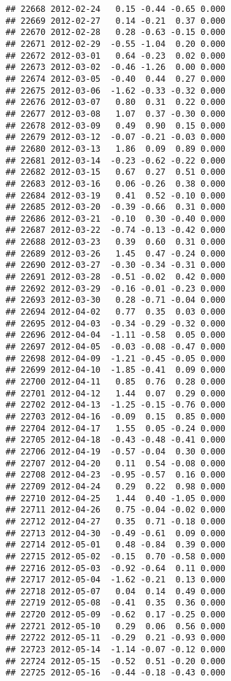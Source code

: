 \documentclass[
]{article}
\begin{document}
\begin{verbatim}
## 22668 2012-02-24   0.15 -0.44 -0.65 0.000
## 22669 2012-02-27   0.14 -0.21  0.37 0.000
## 22670 2012-02-28   0.28 -0.63 -0.15 0.000
## 22671 2012-02-29  -0.55 -1.04  0.20 0.000
## 22672 2012-03-01   0.64 -0.23  0.02 0.000
## 22673 2012-03-02  -0.46 -1.26  0.00 0.000
## 22674 2012-03-05  -0.40  0.44  0.27 0.000
## 22675 2012-03-06  -1.62 -0.33 -0.32 0.000
## 22676 2012-03-07   0.80  0.31  0.22 0.000
## 22677 2012-03-08   1.07  0.37 -0.30 0.000
## 22678 2012-03-09   0.49  0.90  0.15 0.000
## 22679 2012-03-12  -0.07 -0.21 -0.03 0.000
## 22680 2012-03-13   1.86  0.09  0.89 0.000
## 22681 2012-03-14  -0.23 -0.62 -0.22 0.000
## 22682 2012-03-15   0.67  0.27  0.51 0.000
## 22683 2012-03-16   0.06 -0.26  0.38 0.000
## 22684 2012-03-19   0.41  0.52 -0.10 0.000
## 22685 2012-03-20  -0.39 -0.66  0.31 0.000
## 22686 2012-03-21  -0.10  0.30 -0.40 0.000
## 22687 2012-03-22  -0.74 -0.13 -0.42 0.000
## 22688 2012-03-23   0.39  0.60  0.31 0.000
## 22689 2012-03-26   1.45  0.47 -0.24 0.000
## 22690 2012-03-27  -0.30 -0.34 -0.31 0.000
## 22691 2012-03-28  -0.51 -0.02  0.42 0.000
## 22692 2012-03-29  -0.16 -0.01 -0.23 0.000
## 22693 2012-03-30   0.28 -0.71 -0.04 0.000
## 22694 2012-04-02   0.77  0.35  0.03 0.000
## 22695 2012-04-03  -0.34 -0.29 -0.32 0.000
## 22696 2012-04-04  -1.11 -0.58  0.05 0.000
## 22697 2012-04-05  -0.03 -0.08 -0.47 0.000
## 22698 2012-04-09  -1.21 -0.45 -0.05 0.000
## 22699 2012-04-10  -1.85 -0.41  0.09 0.000
## 22700 2012-04-11   0.85  0.76  0.28 0.000
## 22701 2012-04-12   1.44  0.07  0.29 0.000
## 22702 2012-04-13  -1.25 -0.15 -0.76 0.000
## 22703 2012-04-16  -0.09  0.15  0.85 0.000
## 22704 2012-04-17   1.55  0.05 -0.24 0.000
## 22705 2012-04-18  -0.43 -0.48 -0.41 0.000
## 22706 2012-04-19  -0.57 -0.04  0.30 0.000
## 22707 2012-04-20   0.11  0.54 -0.08 0.000
## 22708 2012-04-23  -0.95 -0.57  0.16 0.000
## 22709 2012-04-24   0.29  0.22  0.98 0.000
## 22710 2012-04-25   1.44  0.40 -1.05 0.000
## 22711 2012-04-26   0.75 -0.04 -0.02 0.000
## 22712 2012-04-27   0.35  0.71 -0.18 0.000
## 22713 2012-04-30  -0.49 -0.61  0.09 0.000
## 22714 2012-05-01   0.48 -0.84  0.39 0.000
## 22715 2012-05-02  -0.15  0.70 -0.58 0.000
## 22716 2012-05-03  -0.92 -0.64  0.11 0.000
## 22717 2012-05-04  -1.62 -0.21  0.13 0.000
## 22718 2012-05-07   0.04  0.14  0.49 0.000
## 22719 2012-05-08  -0.41  0.35  0.36 0.000
## 22720 2012-05-09  -0.62  0.17 -0.25 0.000
## 22721 2012-05-10   0.29  0.06  0.56 0.000
## 22722 2012-05-11  -0.29  0.21 -0.93 0.000
## 22723 2012-05-14  -1.14 -0.07 -0.12 0.000
## 22724 2012-05-15  -0.52  0.51 -0.20 0.000
## 22725 2012-05-16  -0.44 -0.18 -0.43 0.000

\end{verbatim}
\end{document}
